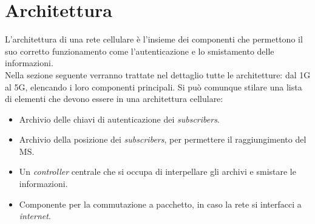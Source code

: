 \clearpage

\section{Architettura}
L'architettura di una rete cellulare è l'insieme dei componenti che permettono il suo corretto funzionamento come l'autenticazione e lo smistamento delle informazioni.\\
Nella sezione seguente verranno trattate nel dettaglio tutte le architetture: dal 1G al 5G, elencando i loro componenti principali. Si può comunque stilare una lista di elementi 
che devono essere in una architettura cellulare:
\begin{itemize}
    \item Archivio delle chiavi di autenticazione dei \textit{subscribers}.
    \item Archivio della posizione dei \textit{subscribers}, per permettere il raggiungimento del MS.
    \item Un \textit{controller} centrale che si occupa di interpellare gli archivi e smistare le informazioni.
    \item Componente per la commutazione a pacchetto, in caso la rete si interfacci a \textit{internet}.
\end{itemize}